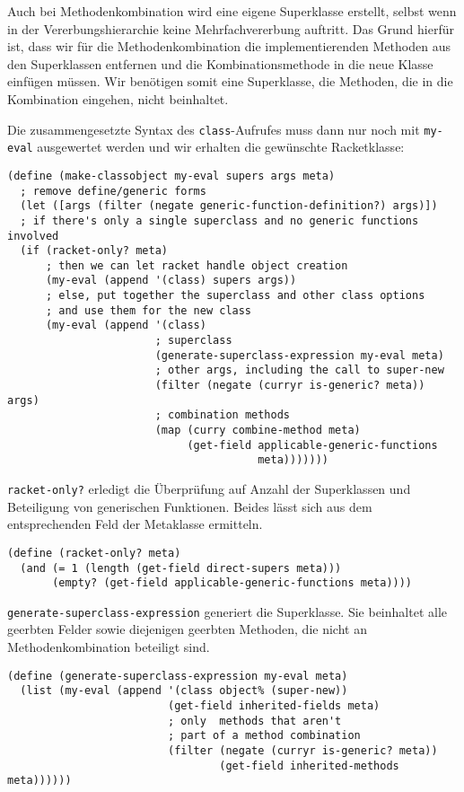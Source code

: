 Auch bei Methodenkombination wird eine eigene Superklasse erstellt, selbst wenn in der Vererbungshierarchie keine Mehrfachvererbung auftritt. Das Grund hierfür ist, dass wir für die Methodenkombination die implementierenden Methoden aus den Superklassen entfernen und die Kombinationsmethode in die neue Klasse einfügen müssen. Wir benötigen somit eine Superklasse, die Methoden, die in die Kombination eingehen, nicht beinhaltet.

Die zusammengesetzte Syntax des \texttt{class}-Aufrufes muss dann nur noch mit \texttt{my-eval} ausgewertet werden und wir erhalten die gewünschte Racketklasse:

\begin{lstlisting}
(define (make-classobject my-eval supers args meta)
  ; remove define/generic forms
  (let ([args (filter (negate generic-function-definition?) args)])
  ; if there's only a single superclass and no generic functions involved
  (if (racket-only? meta)
      ; then we can let racket handle object creation
      (my-eval (append '(class) supers args))
      ; else, put together the superclass and other class options
      ; and use them for the new class
      (my-eval (append '(class)
                       ; superclass
                       (generate-superclass-expression my-eval meta)
                       ; other args, including the call to super-new
                       (filter (negate (curryr is-generic? meta)) args)
                       ; combination methods
                       (map (curry combine-method meta)
                            (get-field applicable-generic-functions
                                       meta)))))))
\end{lstlisting}

\texttt{racket-only?} erledigt die Überprüfung auf Anzahl der Superklassen und Beteiligung von generischen Funktionen. Beides lässt sich aus dem entsprechenden Feld der Metaklasse ermitteln. 

\begin{lstlisting}
(define (racket-only? meta)
  (and (= 1 (length (get-field direct-supers meta)))
       (empty? (get-field applicable-generic-functions meta))))
\end{lstlisting}

\texttt{generate-superclass-expression} generiert die Superklasse. Sie beinhaltet alle geerbten Felder sowie diejenigen geerbten Methoden, die nicht an Methodenkombination beteiligt sind. 

\begin{lstlisting}
(define (generate-superclass-expression my-eval meta)
  (list (my-eval (append '(class object% (super-new))
                         (get-field inherited-fields meta)
                         ; only  methods that aren't
                         ; part of a method combination
                         (filter (negate (curryr is-generic? meta))
                                 (get-field inherited-methods meta))))))
\end{lstlisting}

